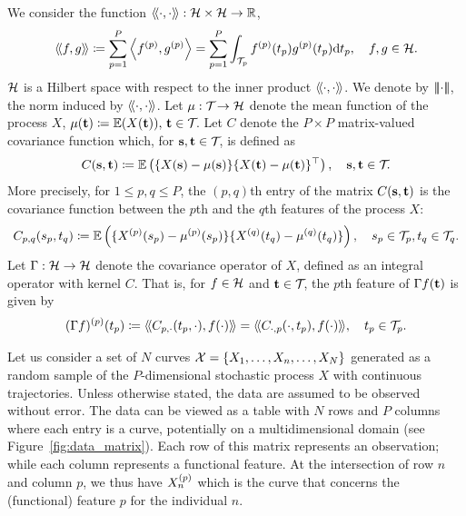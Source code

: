 We consider the function $\langle\!\langle\cdot, \cdot\rangle\!\rangle : \mathcal{H} \times \mathcal{H} \rightarrow \mathbb{R}$,
\begin{equation}\label{eq:innerprodH}
    \langle\!\langle f, g\rangle\!\rangle \coloneqq \sum_{p=1}^{P} \left\langle f^{(p)}, g^{(p)}\right\rangle = \sum_{p=1}^{P}\int_{\mathcal{T}_{p}} f^{(p)}(t_p)g^{(p)}(t_p) {\rm d} t_p, \quad f, g \in \mathcal{H}.
\end{equation}
$\mathcal{H}$ is a Hilbert space with respect to the inner product $\langle\!\langle\cdot, \cdot\rangle\!\rangle$\citep{happMultivariateFunctionalPrincipal2018a}. We denote by $\left|\!\left|\!\left|\cdot\right|\!\right|\!\right|$, the norm induced by $\langle\!\langle\cdot, \cdot\rangle\!\rangle$. Let $\mu : \mathcal{T}_{} \rightarrow \mathcal{H}$ denote the mean function of the process $X$, $\mu(\mathbf{t}) \coloneqq \mathbb{E}(X(\mathbf{t})),\,\mathbf{t} \in \mathcal{T}_{}$. Let $C$ denote the $P \times P$ matrix-valued covariance function which, for $\mathbf{s}, \mathbf{t} \in \mathcal{T}_{}$, is defined as
\begin{equation}\label{eq:covariance_function}
    C(\mathbf{s}, \mathbf{t}) \coloneqq \mathbb{E}\left(\{X(\mathbf{s}) - \mu(\mathbf{s})\}\{X(\mathbf{t}) - \mu(\mathbf{t})\}^{\top}\right), \quad \mathbf{s}, \mathbf{t} \in \mathcal{T}_{}.
\end{equation}
More precisely, for $1 \leq p, q \leq P$, the $(p, q)$th entry of the matrix $C(\mathbf{s}, \mathbf{t})$ is the covariance function between the $p$th and the $q$th features of the process $X$:
\begin{equation}\label{eq:covariance_function_components}
    C_{p, q}(s_p, t_q) \coloneqq \mathbb{E}\left(\{X^{(p)}(s_p) - \mu^{(p)}(s_p)\}\{X^{(q)}(t_q) - \mu^{(q)}(t_q)\}\right), \quad s_p \in \mathcal{T}_{p}, t_q \in \mathcal{T}_{q}.
\end{equation}
Let $\Gamma : \mathcal{H} \rightarrow \mathcal{H}$ denote the covariance operator of $X$, defined as an integral operator with kernel $C$. That is, for $f \in \mathcal{H}$ and $\mathbf{t} \in \mathcal{T}_{}$, the $p$th feature of $\Gamma f(\mathbf{t})$ is given by
\begin{equation}\label{eq:covariance_operator_components}
    (\Gamma f)^{(p)}(t_p) \coloneqq \langle\!\langle C_{p, \cdot}(t_p, \cdot), f(\cdot)\rangle\!\rangle = \langle\!\langle C_{\cdot, p}(\cdot, t_p), f(\cdot)\rangle\!\rangle, \quad t_p \in \mathcal{T}_{p}.
\end{equation}

Let us consider a set of $N$ curves $\mathcal{X} = \{X_1, \ldots, X_n, \ldots, X_N\}$ generated as a random sample of the $P$-dimensional stochastic process $X$ with continuous trajectories. Unless otherwise stated, the data are assumed to be observed without error. The data can be viewed as a table with $N$ rows and $P$ columns where each entry is a curve, potentially on a multidimensional domain (see Figure~\ref{fig:data_matrix}). Each row of this matrix represents an observation; while each column represents a functional feature. At the intersection of row $n$ and column $p$, we thus have $X_n^{(p)}$ which is the curve that concerns the (functional) feature $p$ for the individual $n$.


